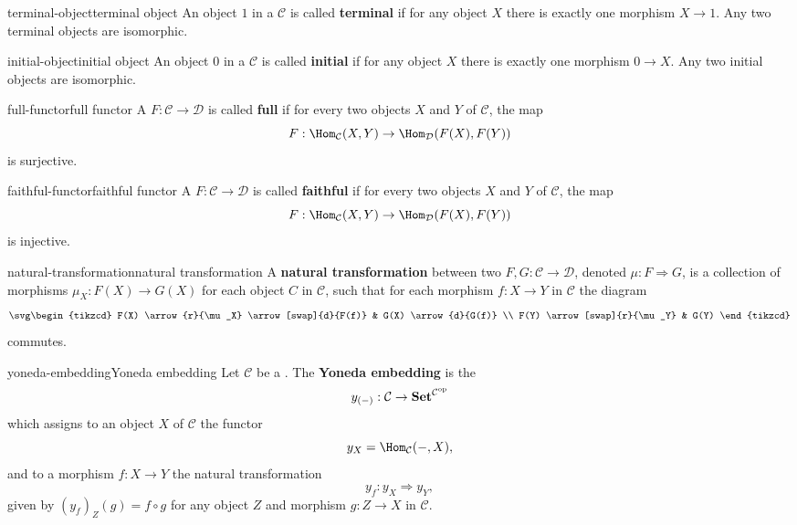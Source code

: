 \begin{topic}{terminal-object}{terminal object}
    An object $1$ in a  $\mathcal{C}$ is called \textbf{terminal} if for any object $X$ there is exactly one morphism $X \to 1$. Any two terminal objects are isomorphic.
\end{topic}

\begin{topic}{initial-object}{initial object}
    An object $0$ in a  $\mathcal{C}$ is called \textbf{initial} if for any object $X$ there is exactly one morphism $0 \to X$. Any two initial objects are isomorphic.
\end{topic}

\begin{topic}{full-functor}{full functor}
    A  $F : \mathcal{C} \to \mathcal{D}$ is called \textbf{full} if for every two objects $X$ and $Y$ of $\mathcal{C}$, the map
    \[ F : \Hom_{\mathcal{C}}(X, Y) \to \Hom_{\mathcal{D}}(F(X), F(Y)) \]
    is surjective.
\end{topic}

\begin{topic}{faithful-functor}{faithful functor}
    A  $F : \mathcal{C} \to \mathcal{D}$ is called \textbf{faithful} if for every two objects $X$ and $Y$ of $\mathcal{C}$, the map
    \[ F : \Hom_{\mathcal{C}}(X, Y) \to \Hom_{\mathcal{D}}(F(X), F(Y)) \]
    is injective.
\end{topic}

\begin{topic}{natural-transformation}{natural transformation}
    A \textbf{natural transformation} between two  $F, G : \mathcal{C} \to \mathcal{D}$, denoted $\mu : F \Rightarrow G$, is a collection of morphisms $\mu_X : F(X) \to G(X)$ for each object $C$ in $\mathcal{C}$, such that for each morphism $f : X \to Y$ in $\mathcal{C}$ the diagram
    \[ \svg \begin{tikzcd} F(X) \arrow{r}{\mu_X} \arrow[swap]{d}{F(f)} & G(X) \arrow{d}{G(f)} \\ F(Y) \arrow[swap]{r}{\mu_Y} & G(Y) \end{tikzcd} \]
    commutes. 
\end{topic}

\begin{topic}{yoneda-embedding}{Yoneda embedding}
    Let $\mathcal{C}$ be a . The \textbf{Yoneda embedding} is the 
    \[ y_{(-)} : \mathcal{C} \to \textbf{Set}^{\mathcal{C}^\textup{op}} \]
    which assigns to an object $X$ of $\mathcal{C}$ the functor
    \[ y_X = \Hom_{\mathcal{C}}(-, X) , \]
    and to a morphism $f : X \to Y$ the natural transformation
    \[ y_f : y_X \Rightarrow y_Y , \]
    given by $(y_f)_Z(g) = f \circ g$ for any object $Z$ and morphism $g : Z \to X$ in $\mathcal{C}$.
\end{topic}

